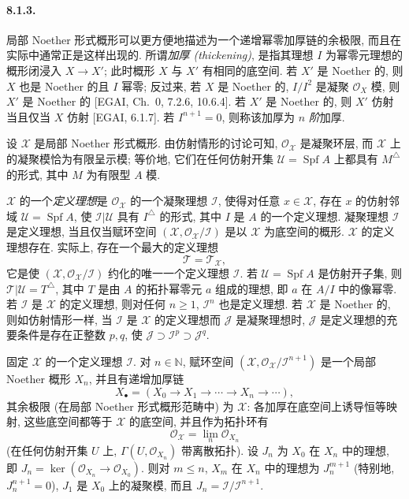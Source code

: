 \paragraph{8.1.3.}
局部 Noether 形式概形可以更方便地描述为一个递增幂零加厚链的余极限, 而且在实际中通常正是这样出现的. 所谓\emph{加厚 (thickening)}, 是指其理想 $I$ 为幂零元理想的概形闭浸入 $X\to X'$; 此时概形 $X$ 与 $X'$ 有相同的底空间. 若 $X'$ 是 Noether 的, 则 $X$ 也是 Noether 的且 $I$ 幂零; 反过来, 若 $X$ 是 Noether 的, $I/I^2$ 是凝聚 $\mathcal O_X$ 模, 则 $X'$ 是 Noether 的 [EGAI, Ch.~0, 7.2.6, 10.6.4]. 若 $X'$ 是 Noether 的, 则 $X'$ 仿射当且仅当 $X$ 仿射 [EGAI, 6.1.7]. 若 $I^{n+1}=0$, 则称该加厚为 $n$ \emph{阶}加厚.

设 $\mathcal X$ 是局部 Noether 形式概形. 由仿射情形的讨论可知, $\mathcal O_{\mathcal X}$ 是凝聚环层, 而 $\mathcal X$ 上的凝聚模恰为有限呈示模; 等价地, 它们在任何仿射开集 $\mathcal U=\operatorname{Spf}A$ 上都具有 $M^\triangle$ 的形式, 其中 $M$ 为有限型 $A$ 模.

$\mathcal X$ 的一个\emph{定义理想}是 $\mathcal O_{\mathcal X}$ 的一个凝聚理想 $\mathcal I$, 使得对任意 $x\in\mathcal X$, 存在 $x$ 的仿射邻域 $\mathcal U=\operatorname{Spf}A$, 使 $\mathcal I|\mathcal U$ 具有 $I^\triangle$ 的形式, 其中 $I$ 是 $A$ 的一个定义理想. 凝聚理想 $\mathcal I$ 是定义理想, 当且仅当赋环空间 $(\mathcal X,\mathcal O_{\mathcal X}/\mathcal I)$ 是以 $\mathcal X$ 为底空间的概形. $\mathcal X$ 的定义理想存在. 实际上, 存在一个最大的定义理想
\begin{equation}\mathcal T=\mathcal T_{\mathcal X},\tag{8.1.3.1}\label{ch08:eq8131}\end{equation}
它是使 $(\mathcal X,\mathcal O_{\mathcal X}/\mathcal I)$ 约化的唯一一个定义理想 $\mathcal I$. 若 $\mathcal U=\operatorname{Spf}A$ 是仿射开子集, 则 $\mathcal T|\mathcal U=T^\triangle$, 其中 $T$ 是由 $A$ 的拓扑幂零元 $a$ 组成的理想, 即 $a$ 在 $A/I$ 中的像幂零. 若 $\mathcal I$ 是 $\mathcal X$ 的定义理想, 则对任何 $n\geq1$, $\mathcal I^n$ 也是定义理想. 若 $\mathcal X$ 是 Noether 的, 则如仿射情形一样, 当 $\mathcal I$ 是 $\mathcal X$ 的定义理想而 $\mathcal J$ 是凝聚理想时, $\mathcal J$ 是定义理想的充要条件是存在正整数 $p,q$, 使 $\mathcal J\supset\mathcal I^p\supset\mathcal J^q$.

固定 $\mathcal X$ 的一个定义理想 $\mathcal I$. 对 $n\in\mathbb N$, 赋环空间 $(\mathcal X,\mathcal O_{\mathcal X}/\mathcal I^{n+1})$ 是一个局部 Noether 概形 $X_n$, 并且有递增加厚链
\begin{equation}X_\bullet=(X_0\longrightarrow X_1\longrightarrow\cdots\longrightarrow X_n\longrightarrow\cdots),\tag{8.1.3.2}\label{ch08:eq8132}\end{equation}
其余极限 (在局部 Noether 形式概形范畴中) 为 $\mathcal X$: 各加厚在底空间上诱导恒等映射, 这些底空间都等于 $\mathcal X$ 的底空间,
并且作为拓扑环有
\[\mathcal O_{\mathcal X}=\lim_n\mathcal O_{X_n}\]
(在任何仿射开集 $U$ 上, $\Gamma(U,\mathcal O_{X_n})$ 带离散拓扑). 设 $J_n$ 为 $X_0$ 在 $X_n$ 中的理想, 即 $J_n=\ker(\mathcal O_{X_n}\to\mathcal O_{X_0})$. 则对 $m\leq n$, $X_m$ 在 $X_n$ 中的理想为 $J_n^{m+1}$ (特别地, $J_n^{n+1}=0$), $J_1$ 是 $X_0$ 上的凝聚模, 而且 $J_n=\mathcal I/\mathcal I^{n+1}$.

